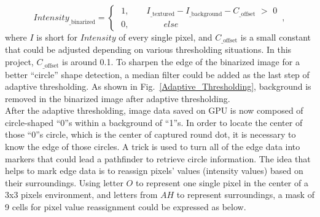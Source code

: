 \begin{equation}
%
Intensity_{\text{\_binarized}} = %
%
\begin{cases}
\,\, 1 , \quad \quad I_{\text{\_textured}} - I_{\text{\_background}}  -  C_{\text{\_offset}} \,\, > \,\,0 %
\\%
\,\, 0 , \quad \quad \quad \quad else%
\end{cases}
 \, ,%
\end{equation}%
%
where \(I\) is short for \(Intensity\) of every single pixel, and \(C_{\text{\_offset}}\) is a small constant that could be adjusted depending on various thresholding situations. In this project, \(C_{\text{\_offset}}\) is around 0.1.%
%
To sharpen the edge of the binarized image for a better \enquote{circle} shape detection, a median filter could be added as the last step of adaptive thresholding. As shown in Fig.~\ref{Adaptive_Thresholding}, background is removed in the binarized image after adaptive thresholding.
\\\indent
%
%
After the adaptive thresholding, image data saved on GPU is now composed of circle-shaped \enquote{0}s within a background of \enquote{1}s. In order to locate the center of those \enquote{0}s circle, which is the center of captured round dot, it is necessary to know the edge of those circles. A trick is used to turn all of the edge data into markers that could lead a pathfinder to retrieve circle information.%
%
The idea that helps to mark edge data is to reassign pixels' values (intensity values) based on their surroundings. Using letter \(O\) to represent one single pixel in the center of a 3x3 pixels environment, and letters from \(A\)\texttildelow \(H\) to represent surroundings, a mask of 9 cells for pixel value reassignment could be expressed as below.

